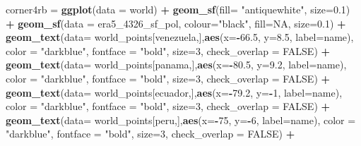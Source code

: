 \documentclass[12pt,oneside]{reedthesis}
\newenvironment{Shaded}{\begin{snugshade}}{\end{snugshade}}
\newcommand{\DataTypeTok}[1]{\textcolor[rgb]{0.13,0.29,0.53}{#1}}
\newcommand{\DecValTok}[1]{\textcolor[rgb]{0.00,0.00,0.81}{#1}}
\newcommand{\FloatTok}[1]{\textcolor[rgb]{0.00,0.00,0.81}{#1}}
\newcommand{\KeywordTok}[1]{\textcolor[rgb]{0.13,0.29,0.53}{\textbf{#1}}}
\newcommand{\NormalTok}[1]{#1}
\newcommand{\OperatorTok}[1]{\textcolor[rgb]{0.81,0.36,0.00}{\textbf{#1}}}
\newcommand{\OtherTok}[1]{\textcolor[rgb]{0.56,0.35,0.01}{#1}}
\newcommand{\StringTok}[1]{\textcolor[rgb]{0.31,0.60,0.02}{#1}}
\begin{document}
\begin{Shaded}
\begin{Highlighting}[]
\NormalTok{corner4rb =}\StringTok{ }\KeywordTok{ggplot}\NormalTok{(}\DataTypeTok{data =}\NormalTok{ world) }\OperatorTok{+}\StringTok{ }
\StringTok{  }\KeywordTok{geom_sf}\NormalTok{(}\DataTypeTok{fill=} \StringTok{"antiquewhite"}\NormalTok{,  }\DataTypeTok{size=}\FloatTok{0.1}\NormalTok{) }\OperatorTok{+}\StringTok{ }
\StringTok{  }\KeywordTok{geom_sf}\NormalTok{(}\DataTypeTok{data =}\NormalTok{ era5_}\DecValTok{4326}\NormalTok{_sf_pol, }\DataTypeTok{colour=}\StringTok{"black"}\NormalTok{, }\DataTypeTok{fill=}\OtherTok{NA}\NormalTok{, }\DataTypeTok{size=}\FloatTok{0.1}\NormalTok{) }\OperatorTok{+}\StringTok{ }
\StringTok{  }\KeywordTok{geom_text}\NormalTok{(}\DataTypeTok{data=}\NormalTok{ world_points[venezuela,],}\KeywordTok{aes}\NormalTok{(}\DataTypeTok{x=}\OperatorTok{-}\FloatTok{66.5}\NormalTok{, }\DataTypeTok{y=}\FloatTok{8.5}\NormalTok{, }\DataTypeTok{label=}\NormalTok{name), }\DataTypeTok{color =} \StringTok{"darkblue"}\NormalTok{, }\DataTypeTok{fontface =} \StringTok{"bold"}\NormalTok{, }\DataTypeTok{size=}\DecValTok{3}\NormalTok{, }\DataTypeTok{check_overlap =} \OtherTok{FALSE}\NormalTok{) }\OperatorTok{+}
\StringTok{  }\KeywordTok{geom_text}\NormalTok{(}\DataTypeTok{data=}\NormalTok{ world_points[panama,],}\KeywordTok{aes}\NormalTok{(}\DataTypeTok{x=}\OperatorTok{-}\FloatTok{80.5}\NormalTok{, }\DataTypeTok{y=}\FloatTok{9.2}\NormalTok{, }\DataTypeTok{label=}\NormalTok{name), }\DataTypeTok{color =} \StringTok{"darkblue"}\NormalTok{, }\DataTypeTok{fontface =} \StringTok{"bold"}\NormalTok{, }\DataTypeTok{size=}\DecValTok{3}\NormalTok{, }\DataTypeTok{check_overlap =} \OtherTok{FALSE}\NormalTok{) }\OperatorTok{+}\StringTok{ }
\StringTok{  }\KeywordTok{geom_text}\NormalTok{(}\DataTypeTok{data=}\NormalTok{ world_points[ecuador,],}\KeywordTok{aes}\NormalTok{(}\DataTypeTok{x=}\OperatorTok{-}\FloatTok{79.2}\NormalTok{, }\DataTypeTok{y=}\OperatorTok{-}\DecValTok{1}\NormalTok{, }\DataTypeTok{label=}\NormalTok{name), }\DataTypeTok{color =} \StringTok{"darkblue"}\NormalTok{, }\DataTypeTok{fontface =} \StringTok{"bold"}\NormalTok{, }\DataTypeTok{size=}\DecValTok{3}\NormalTok{, }\DataTypeTok{check_overlap =} \OtherTok{FALSE}\NormalTok{) }\OperatorTok{+}
\StringTok{  }\KeywordTok{geom_text}\NormalTok{(}\DataTypeTok{data=}\NormalTok{ world_points[peru,],}\KeywordTok{aes}\NormalTok{(}\DataTypeTok{x=}\OperatorTok{-}\DecValTok{75}\NormalTok{, }\DataTypeTok{y=}\OperatorTok{-}\DecValTok{6}\NormalTok{, }\DataTypeTok{label=}\NormalTok{name), }\DataTypeTok{color =} \StringTok{"darkblue"}\NormalTok{, }\DataTypeTok{fontface =} \StringTok{"bold"}\NormalTok{, }\DataTypeTok{size=}\DecValTok{3}\NormalTok{, }\DataTypeTok{check_overlap =} \OtherTok{FALSE}\NormalTok{) }\OperatorTok{+}

\end{Highlighting}
\end{Shaded}
\end{document}
